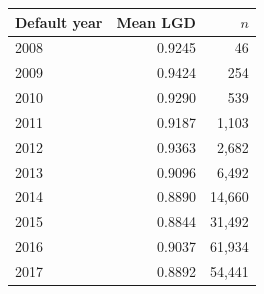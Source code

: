 \begin{tabular}{lrr}
\toprule
Default year & Mean LGD & $n$ \\
\midrule
2008 & 0.9245 & 46 \\
2009 & 0.9424 & 254 \\
2010 & 0.9290 & 539 \\
2011 & 0.9187 & 1,103 \\
2012 & 0.9363 & 2,682 \\
2013 & 0.9096 & 6,492 \\
2014 & 0.8890 & 14,660 \\
2015 & 0.8844 & 31,492 \\
2016 & 0.9037 & 61,934 \\
2017 & 0.8892 & 54,441 \\
\bottomrule
\end{tabular}
